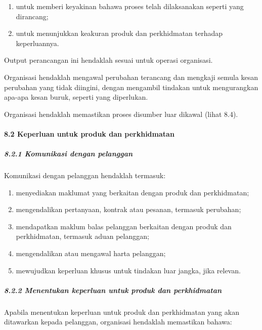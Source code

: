 \documentclass[
]{article}
\begin{document}
\begin{enumerate}
\def\labelenumi{\arabic{enumi})}
\item
  untuk memberi keyakinan bahawa proses telah dilaksanakan seperti yang
  dirancang;
\item
  untuk menunjukkan keakuran produk dan perkhidmatan terhadap
  keperluannya.
\end{enumerate}

Output perancangan ini hendaklah sesuai untuk operasi organisasi.

Organisasi hendaklah mengawal perubahan terancang dan mengkaji semula
kesan perubahan yang tidak diingini, dengan mengambil tindakan untuk
mengurangkan apa-apa kesan buruk, seperti yang diperlukan.

Organisasi hendaklah memastikan proses disumber luar dikawal (lihat
8.4).

\hypertarget{keperluan-untuk-produk-dan-perkhidmatan}{%
\paragraph{8.2 Keperluan untuk produk dan
perkhidmatan}\label{keperluan-untuk-produk-dan-perkhidmatan}}

\hypertarget{komunikasi-dengan-pelanggan}{%
\subparagraph{8.2.1 Komunikasi dengan
pelanggan}\label{komunikasi-dengan-pelanggan}}

Komunikasi dengan pelanggan hendaklah termasuk:

\begin{enumerate}
\def\labelenumi{\alph{enumi})}
\item
  menyediakan maklumat yang berkaitan dengan produk dan perkhidmatan;
\item
  mengendalikan pertanyaan, kontrak atau pesanan, termasuk perubahan;
\item
  mendapatkan maklum balas pelanggan berkaitan dengan produk dan
  perkhidmatan, termasuk aduan pelanggan;
\item
  mengendalikan atau mengawal harta pelanggan;
\item
  mewujudkan keperluan khusus untuk tindakan luar jangka, jika relevan.
\end{enumerate}

\hypertarget{menentukan-keperluan-untuk-produk-dan-perkhidmatan}{%
\subparagraph{8.2.2 Menentukan keperluan untuk produk dan
perkhidmatan}\label{menentukan-keperluan-untuk-produk-dan-perkhidmatan}}

Apabila menentukan keperluan untuk produk dan perkhidmatan yang akan
ditawarkan kepada pelanggan, organisasi hendaklah memastikan bahawa:
\end{document}
